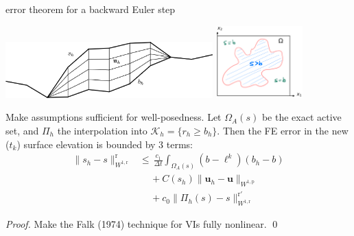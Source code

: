 \documentclass[10pt,dvipsnames]{beamer}
\newcommand{\bu}{\mathbf{u}}
\newcommand{\cK}{\mathcal{K}}
\newcommand{\pp}{\mathrm{p}}
\newcommand{\rr}{\mathrm{r}}
\begin{document}
\begin{frame}{error theorem for a backward Euler step}

\noindent \includegraphics[width=0.6\textwidth]{extruded} \hfill \includegraphics[width=0.25\textwidth]{mapplane}

\medskip
\begin{theorem}[Bueler, 2024]
Make assumptions sufficient for well-posedness.  Let $\Omega_A(s)$ be  the exact active set, and $\Pi_h$ the interpolation into $\cK_h = \{r_h \ge b_h\}$.  Then the FE error in the new ($t_k$) surface elevation is bounded by 3 terms:
\begin{align*}
\|s_h-s\|_{W^{1,\rr}}^\rr &\le \, \frac{c_1}{\Delta t} \int_{\Omega_A(s)} (b - \ell^k) (b_h - b) \\
   &\quad\, + C(s_h) \big\|\bu_h - \bu\big\|_{W^{1,\pp}} \\
   &\quad\, + c_0 \|\Pi_h(s) - s\|_{W^{1,\rr}}^{\rr'}
\end{align*}
\end{theorem}

\noindent \emph{Proof.} Make the Falk (1974) technique for VIs fully nonlinear. \qed
\end{frame}


\newcommand{\sdoi}[1]{\,{\scriptsize \href{https://doi.org/#1}{doi:#1}}}
\newcommand{\surl}[2]{\,{\scriptsize \href{#1}{#2}}}
\end{document}
